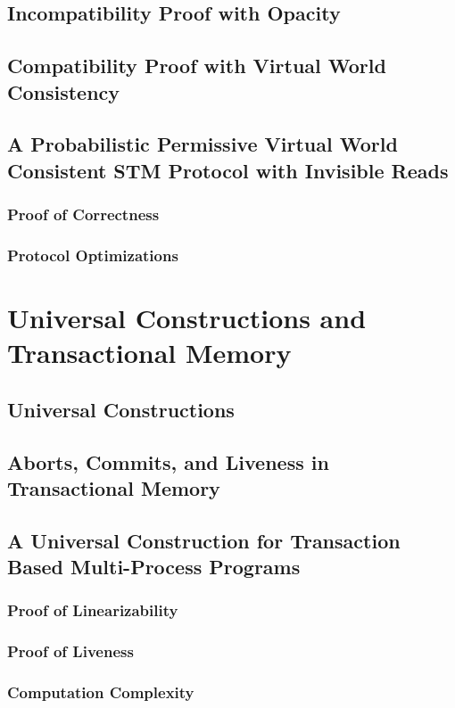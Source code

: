 \documentclass[11pt]{book}
\begin{document}
\section{Incompatibility Proof with Opacity}
\section{Compatibility Proof with Virtual World Consistency}
\section{A Probabilistic Permissive Virtual World Consistent STM Protocol with Invisible Reads}
\subsection{Proof of Correctness}
\subsection{Protocol Optimizations}


\chapter{Universal Constructions and Transactional Memory}
\label{chap:models}
%
\section{Universal Constructions}
\section{Aborts, Commits, and Liveness in Transactional Memory}
\section{A Universal Construction for Transaction Based Multi-Process Programs}
\subsection{Proof of Linearizability}
\subsection{Proof of Liveness}
\subsection{Computation Complexity}
\end{document}
